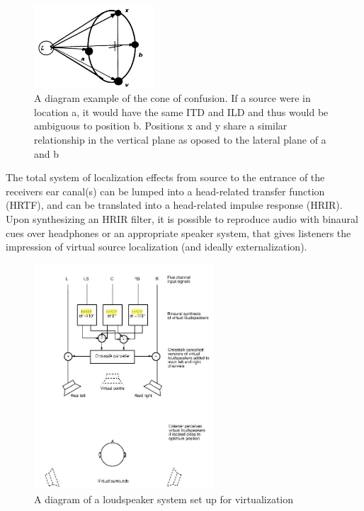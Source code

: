 \documentclass[paper=a4, fontsize=10pt, font=arial]{scrartcl} %
\numberwithin{equation}{section} %
\numberwithin{figure}{section} %
\numberwithin{table}{section} %
\begin{document}
\begin{figure}[H]
\centering
\includegraphics[width=0.4\textwidth]{coneofconfusion.jpg}
\centering
\caption{A diagram example of the cone of confusion. If a source were in location a, it would have the same ITD and ILD and thus would be ambiguous to position b. Positions x and y share a similar relationship in the vertical plane as oposed to the lateral plane of a and b~\cite{Begault1995}}
\end{figure}

The total system of localization effects from source to the entrance of the receivers ear canal(s) can be lumped into a head-related transfer function (HRTF), and can be translated into a head-related impulse response (HRIR). Upon synthesizing an HRIR filter, it is possible to reproduce audio with binaural cues over headphones or an appropriate speaker system, that gives listeners the impression of virtual source localization (and ideally externalization). 

\begin{figure}[H]
\centering
\includegraphics[width=0.6\textwidth]{virtualizationoverspeakers.JPG}
\centering
\caption{A diagram of a loudspeaker system set up for virtualization~\cite{rumsey2012spatial}}
\end{figure}
\end{document}
